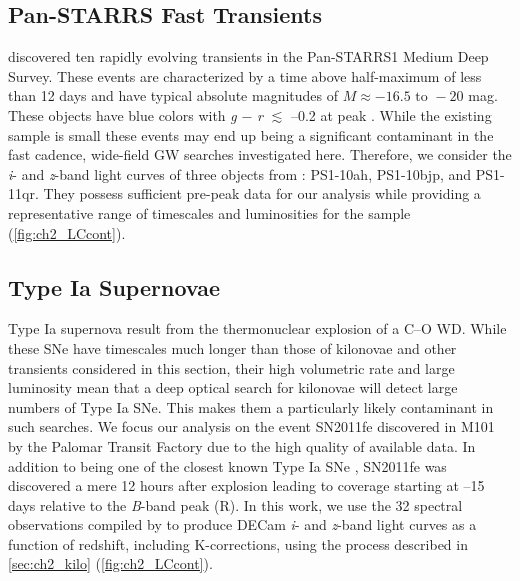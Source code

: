\subsection{Pan-STARRS Fast Transients}
\label{sec:ch2_PSFast}
\citet{Drout+14} discovered ten rapidly evolving transients in the Pan-STARRS1 Medium Deep Survey. These events are characterized by a time above half-maximum of less than 12 days and have typical absolute magnitudes of $M \approx -16.5 \text{ to } -20$ mag. These objects have blue colors with {\em g} $-$ {\em r} $\lesssim$ --0.2 at peak \citep{Drout+14}. While the existing sample is small these events may end up being a significant contaminant in the fast cadence, wide-field GW searches investigated here. Therefore, we consider the {\em i}- and {\em z}-band light curves of three objects from \citet{Drout+14}: PS1-10ah, PS1-10bjp, and PS1-11qr. They possess sufficient pre-peak data for our analysis while providing a representative range of timescales and luminosities for the sample (\autoref{fig:ch2_LCcont}).

\subsection{Type Ia Supernovae}
\label{sec:ch2_typeIa}
Type Ia supernova result from the thermonuclear explosion of a C--O WD. While these SNe have timescales much longer than those of kilonovae and other transients considered in this section, their high volumetric rate and large luminosity mean that a deep optical search for kilonovae will detect large numbers of Type Ia SNe. This makes them a particularly likely contaminant in such searches. We focus our analysis on the event SN2011fe discovered in M101 by the Palomar Transit Factory \citep{Nugent+11a} due to the high quality of available data. In addition to being one of the closest known Type Ia SNe \citep[$\mu = 29.04\pm0.19$,][]{ShappeeStanek11}, SN2011fe was discovered a mere 12 hours after explosion \citep{Nugent+11b} leading to coverage starting at --15 days relative to the {\em B}-band peak (R). In this work, we use the 32 spectral observations compiled by \citet{Pereira+13} to produce DECam {\em i}- and {\em z}-band light curves as a function of redshift, including K-corrections, using the process described in \autoref{sec:ch2_kilo} (\autoref{fig:ch2_LCcont}).

